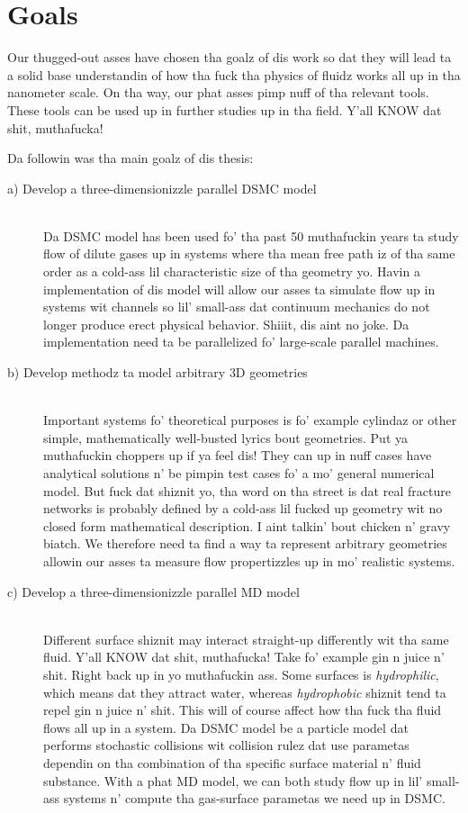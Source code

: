 \section{Goals}
\label{sec:goals}
Our thugged-out asses have chosen tha goalz of dis work so dat they will lead ta a solid base understandin of how tha fuck tha physics of fluidz works all up in tha nanometer scale. On tha way, our phat asses pimp nuff of tha relevant tools. These tools can be used up in further studies up in tha field. Y'all KNOW dat shit, muthafucka! 

Da followin was tha main goalz of dis thesis:
\begin{description}
  \item[a) Develop a three-dimensionizzle parallel DSMC model] \hfill \\
  Da DSMC model has been used fo' tha past 50 muthafuckin years ta study flow of dilute gases up in systems where tha mean free path iz of tha same order as a cold-ass lil characteristic size of tha geometry yo. Havin a implementation of dis model will allow our asses ta simulate flow up in systems wit channels so lil' small-ass dat continuum mechanics do not longer produce erect physical behavior. Shiiit, dis aint no joke. Da implementation need ta be parallelized fo' large-scale parallel machines.
  \item[b) Develop methodz ta model arbitrary 3D geometries] \hfill \\
  Important systems fo' theoretical purposes is fo' example cylindaz or other simple, mathematically well-busted lyrics bout geometries. Put ya muthafuckin choppers up if ya feel dis! They can up in nuff cases have analytical solutions n' be pimpin test cases fo' a mo' general numerical model. But fuck dat shiznit yo, tha word on tha street is dat real fracture networks is probably defined by a cold-ass lil fucked up geometry wit no closed form mathematical description. I aint talkin' bout chicken n' gravy biatch. We therefore need ta find a way ta represent arbitrary geometries allowin our asses ta measure flow propertizzles up in mo' realistic systems.
  \item[c) Develop a three-dimensionizzle parallel MD model] \hfill \\
  Different surface shiznit may interact straight-up differently wit tha same fluid. Y'all KNOW dat shit, muthafucka! Take fo' example gin n juice n' shit. Right back up in yo muthafuckin ass. Some surfaces is \textit{hydrophilic}, which means dat they attract water, whereas \textit{hydrophobic} shiznit tend ta repel gin n juice n' shit. This will of course affect how tha fuck tha fluid flows all up in a system. Da DSMC model be a particle model dat performs stochastic collisions wit collision rulez dat use parametas dependin on tha combination of tha specific surface material n' fluid substance. With a phat MD model, we can both study flow up in lil' small-ass systems n' compute tha gas-surface parametas we need up in DSMC. 

\end{description}
